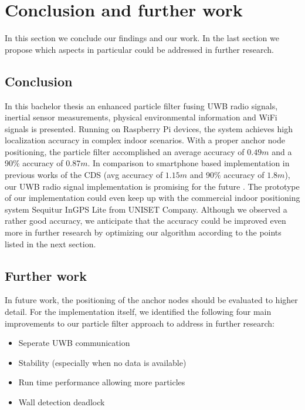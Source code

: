 
\chapter{Conclusion and further work} %

\label{Chapter7} %
In this section we conclude our findings and our work. In the last section we propose which aspects in particular could be addressed in further research. 


\section{Conclusion}
In this bachelor thesis an enhanced particle filter fusing UWB radio signals, inertial sensor measurements, physical environmental information and WiFi signals is presented. Running on Raspberry Pi devices, the system achieves high localization accuracy in complex indoor scenarios. With a proper anchor node positioning, the particle filter accomplished an average accuracy of $0.49m$ and a 90\% accuracy of $0.87m$. In comparison to smartphone based implementation in previous works of the CDS (avg accuracy of $1.15m$ and 90\% accuracy of $1.8m$), our UWB radio signal implementation is promising for the future \cite{Carrera}. The prototype of our implementation could even keep up with the commercial indoor positioning system Sequitur InGPS Lite from UNISET Company. Although we observed a rather good accuracy, we anticipate that the accuracy could be improved even more in further research by optimizing our algorithm according to the points listed in the next section.



\section{Further work}
In future work, the positioning of the anchor nodes should be evaluated to higher detail. For the implementation itself, we identified the following four main improvements to our particle filter approach to address in further research:
\begin{itemize}
\item Seperate UWB communication
\item Stability (especially when no data is available)
\item Run time performance allowing more particles
\item Wall detection deadlock
\end{itemize}

